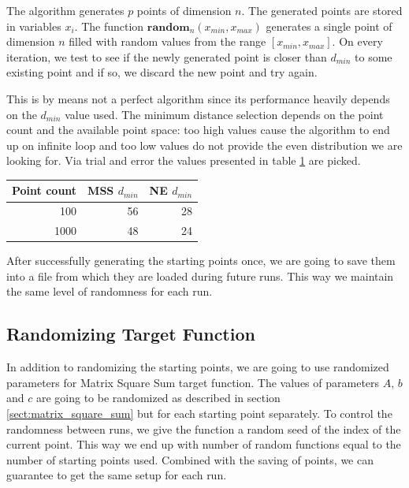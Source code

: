 \documentclass[a4paper,english,titlepage,12pt]{article}
\begin{document}
The algorithm generates $p$ points of dimension $n$. The generated points are stored in variables $x_i$. The function $\mathbf{random}_n(x_{min}, x_{max})$ generates a single point of dimension $n$ filled with random values from the range $[x_{min}, x_{max}]$. On every iteration, we test to see if the newly generated point is closer than $d_{min}$ to some existing point and if so, we discard the new point and try again.

This is by means not a perfect algorithm since its performance heavily depends on the $d_{min}$ value used. The minimum distance selection depends on the point count and the available point space: too high values cause the algorithm to end up on infinite loop and too low values do not provide the even distribution we are looking for. Via trial and error the values presented in table \ref{tab:dmin_values} are picked.

\begin{table}[H]
\centering
{}
\label{tab:dmin_values}
\begin{tabular}{|r|r|r|}
\hline
\rowcolor[HTML]{C0C0C0} 
Point count                       & MSS $d_{min}$ & NE $d_{min}$ \\ \hline
\cellcolor[HTML]{EFEFEF}100  & 56           & 28          \\ \hline
\cellcolor[HTML]{EFEFEF}1000 & 48           & 24          \\ \hline
\end{tabular}
\end{table}

After successfully generating the starting points once, we are going to save them into a file from which they are loaded during future runs. This way we maintain the same level of randomness for each run.

\subsection{Randomizing Target Function}

In addition to randomizing the starting points, we are going to use randomized parameters for Matrix Square Sum target function. The values of parameters $A$, $b$ and $c$ are going to be randomized as described in section \ref{sect:matrix_square_sum} but for each starting point separately. To control the randomness between runs, we give the function a random seed of the index of the current point. This way we end up with number of random functions equal to the number of starting points used. Combined with the saving of points, we can guarantee to get the same setup for each run.
\end{document}
